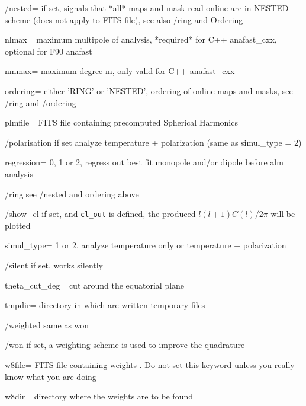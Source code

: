 \begin{keywords}
\begin{kwlist}{}
\item[/nested=] if set, signals that *all* maps and mask read online are in
   NESTED scheme (does not apply to FITS file), see also /ring and Ordering

\item[nlmax=]   maximum multipole of analysis, *required* for C++ anafast\_cxx,
      optional for F90 anafast

\item[nmmax=]   maximum degree m, only valid for C++ anafast\_cxx 

\item[ordering=] either 'RING' or 'NESTED', ordering of online maps and masks,
 see /ring and /ordering

\item[plmfile=] FITS file containing precomputed Spherical Harmonics 

\item[/polarisation] if set analyze temperature + polarization (same as simul\_type = 2)

\item[regression=] 0, 1 or 2, regress out best fit monopole and/or dipole before
    alm analysis

\item[/ring] see /nested and ordering above

\item[/show\_cl] if set, and {\tt cl\_out} is defined, the produced $l (l+1) C(l)/2\pi$ will
be plotted

\item[simul\_type=] 1 or 2, analyze temperature only or temperature + polarization

\item[/silent]    if set, works silently

\item[theta\_cut\_deg=] cut around the equatorial plane 

\item[tmpdir=]      directory in which are written temporary files 

\item[/weighted]     same as won

\item[/won]     if set, a weighting scheme is used to improve the quadrature

\item[w8file=]    FITS file containing weights 
     .
   Do not set this keyword unless you really know what you are doing

\item[w8dir=]     directory where the weights are to be found 

  \end{kwlist}
\end{keywords}  

